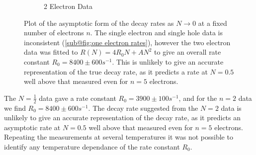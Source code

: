 \begin{figure}[htbp]
\begin{subfigure}{0.45\linewidth}
        \caption{2 Electron Data
        }\label{sub@fig:two electron rates}
    \end{subfigure}
    \caption{Plot of the asymptotic
        form of the decay rates as \(N\rightarrow{}0\)
        at a fixed number of electrons \(n\).
        The single electron and single
        hole data is inconsistent
        (\cref{sub@fig:one electron rates}),
        however the two electron data
        was fitted to \(R(N) = 4R_0N + AN^2\)
        to give an overall rate constant
        \(R_0 = 8400\pm 600s^{-1}\). This is
        unlikely to give an accurate
        representation of the
        true decay rate, as it predicts
        a rate at \(N=0.5\)
        well above that measured even
        for \(n=5\) electrons.
    }\label{fig:small N rate}
\end{figure}
The \(N=\frac{1}{2}\) data
gave a rate constant
\(R_0 = 3900\pm 100s^{-1}\),
and for the \(n=2\) data
we find \(R_0 = 8400\pm 600s^{-1}\).
The decay rate suggested
from the \(N=2\) data is
unlikely to give an accurate
representation of the
decay rate, as it predicts
an asymptotic rate at \(N=0.5\)
well above that measured even
for \(n=5\) electrons.
Repeating the measurements at several
temperatures it was not possible
to identify any
temperature dependance of the
rate constant \(R_0\).

